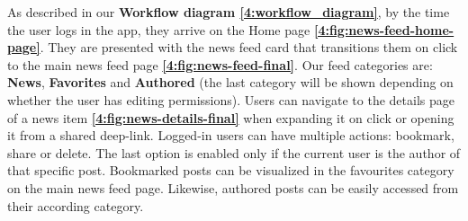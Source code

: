 As described in our \textbf{Workflow diagram \ref{4:workflow_diagram}}, by the time the user logs in the app, they arrive on the Home page \textbf{\ref{4:fig:news-feed-home-page}}. They are presented with the news feed card that transitions them on click to the main news feed page \textbf{\ref{4:fig:news-feed-final}}. Our feed categories are: \textbf{News}, \textbf{Favorites} and \textbf{Authored} (the last category will be shown depending on whether the user has editing permissions). Users can navigate to the details page of a news item \textbf{\ref{4:fig:news-details-final}} when expanding it on click or opening it from a shared deep-link. Logged-in users can have multiple actions: bookmark, share or delete. The last option is enabled only if the current user is the author of that specific post. Bookmarked posts can be visualized in the favourites category on the main news feed page. Likewise, authored posts can be easily accessed from their according category.

